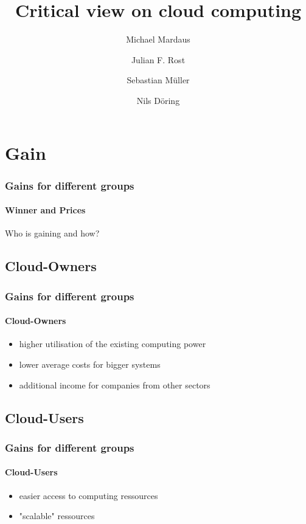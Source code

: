\documentclass[]{beamer}
\author{Michael Mardaus \and Julian F. Rost \and Sebastian Müller \and Nils Döring}
\title{Critical view on cloud computing}
\begin{document}
\begin{frame}
        \titlepage
\end{frame}


\section{Gain}

\begin{frame}
        \frametitle{Gains for different groups}
        \framesubtitle{Winner and Prices}
        Who is gaining and how?
\end{frame}

\subsection{Cloud-Owners}

\begin{frame}
        \frametitle{Gains for different groups}
        \framesubtitle{Cloud-Owners}
        \begin{itemize}
                \item higher utilisation of the existing computing power
                \item lower average costs for bigger systems
                \item additional income for companies from other sectors
        \end{itemize}
\end{frame}

\subsection{Cloud-Users}

\begin{frame}
        \frametitle{Gains for different groups}
        \framesubtitle{Cloud-Users}
        \begin{itemize}
                \item easier access to computing ressources
                \item "scalable" ressources
        \end{itemize}
\end{frame}
\end{document}
